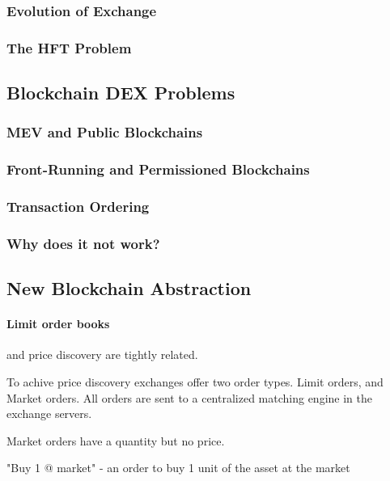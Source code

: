\documentclass[12pt]{article}
\begin{document}
\subsubsection*{Evolution of Exchange}

\subsubsection*{The HFT Problem}
\subsection*{Blockchain DEX Problems}
\subsubsection*{MEV and Public Blockchains}
\subsubsection*{Front-Running and Permissioned Blockchains}
\subsubsection*{Transaction Ordering}
\subsubsection*{Why does it not work?}
\subsection*{New Blockchain Abstraction}


\paragraph*{Limit order books} and price discovery are tightly related. \citep{RePEc:nbr:nberwo:6257} \cite{RePEc:eee:jfinec:v:17:y:1986:i:1:p:5-26}

To achive price discovery exchanges offer two order types. Limit orders, and Market orders. All orders are sent to a centralized matching engine in the exchange servers. 


Market orders have a quantity but no price. 

\begin{enumerate*}
    \item "Buy 1 @ market" - an order to buy 1 unit of the asset at the market  
\end{enumerate*}
\end{document}
